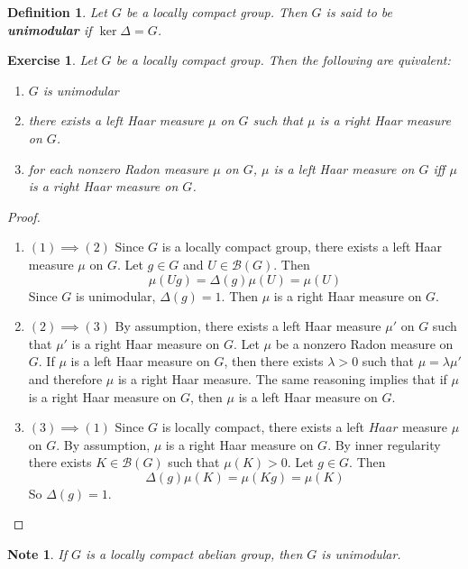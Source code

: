 \documentclass[12pt]{amsart}
\newtheorem{defn}[thm]{Definition}
\newtheorem{note}[thm]{Note}
\newtheorem{ex}[thm]{Exercise}
\newcommand{\Del}{\Delta}
\newcommand{\lam}{\lambda}
\newcommand{\MB}{\mathcal{B}}
\begin{document}
	\begin{defn}
		Let $G$ be a locally compact group. Then $G$ is said to be \textbf{unimodular} if $\ker \Del = G$.  
	\end{defn}
	
	\begin{ex}
		Let $G$ be a locally compact group. Then the following are quivalent: 
		\begin{enumerate}
			\item $G$ is unimodular 
			\item there exists a left  Haar measure $\mu$ on $G$ such that $\mu$ is a right Haar measure on $G$.
			\item for each nonzero Radon measure $\mu$ on $G$, $\mu$ is a left Haar measure on $G$ iff $\mu$ is a right Haar measure on $G$.
		\end{enumerate}
	\end{ex}
	
	\begin{proof}\
		\begin{enumerate}
			\item[]$(1) \implies (2)$ Since $G$ is a locally compact group, there exists a left Haar measure $\mu$ on $G$. Let $g \in G$ and $U \in \MB(G)$. Then $$\mu(Ug) = \Del(g) \mu(U) = \mu(U)$$ Since $G$ is unimodular, $\Del(g) = 1$. Then $\mu$ is a right Haar measure on $G$. \vspace{.5cm}
			\item []$(2) \implies (3)$ By assumption, there exists a left  Haar measure $\mu'$ on $G$ such that $\mu'$ is a right Haar measure on $G$. Let $\mu$ be a nonzero Radon measure on $G$. If $\mu$ is a left Haar measure on $G$, then there exists $\lam >0$ such that $\mu = \lam \mu'$ and therefore $\mu$ is a right Haar measure. The same reasoning implies that if $\mu$ is a right Haar measure on $G$, then $\mu$ is a left Haar measure on $G$.
			\item []$(3) \implies (1)$ Since $G$ is locally compact, there exists a left $Haar$ measure $\mu$ on $G$. By assumption, $\mu$ is a right Haar measure on $G$. By inner regularity there exists $K \in \MB(G)$ such that $\mu(K) > 0$. Let $g \in G$. Then $$\Del(g) \mu(K) = \mu(Kg) = \mu(K)$$ So $\Del(g) = 1$.
		\end{enumerate}
	\end{proof}

	\begin{note}
		If $G$ is a locally compact abelian group, then $G$ is unimodular.
	\end{note}
	
\end{document}
